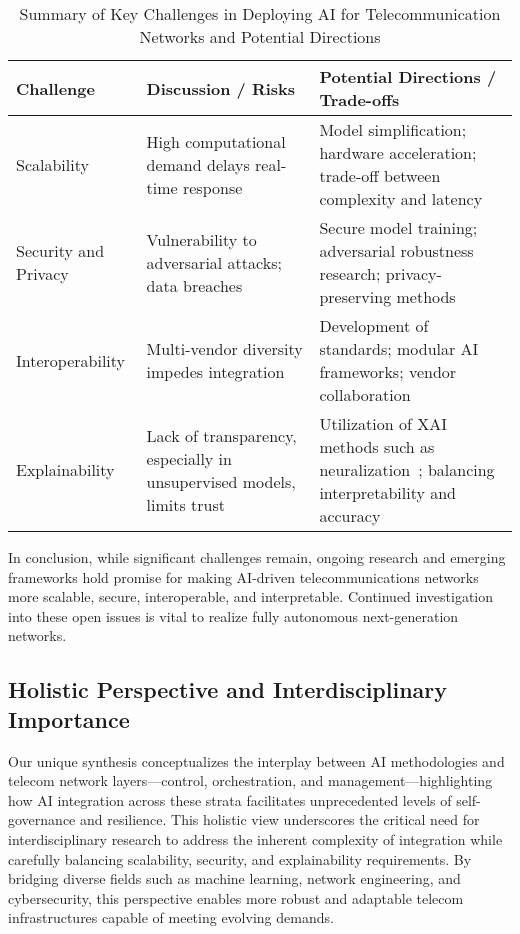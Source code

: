 \documentclass[sigconf]{acmart}
\begin{document}
\begin{table*}[htbp]
\centering
\caption{Summary of Key Challenges in Deploying AI for Telecommunication Networks and Potential Directions}
\label{tab:challenges}
\begin{adjustbox}{max width=\textwidth}
\begin{tabular}{@{}lll@{}}
\toprule
\textbf{Challenge} & \textbf{Discussion / Risks} & \textbf{Potential Directions / Trade-offs} \\ \midrule
Scalability & High computational demand delays real-time response & Model simplification; hardware acceleration; trade-off between complexity and latency \\ 
Security and Privacy & Vulnerability to adversarial attacks; data breaches & Secure model training; adversarial robustness research; privacy-preserving methods \\ 
Interoperability & Multi-vendor diversity impedes integration & Development of standards; modular AI frameworks; vendor collaboration \\ 
Explainability & Lack of transparency, especially in unsupervised models, limits trust & Utilization of XAI methods such as neuralization~\cite{ref45}; balancing interpretability and accuracy \\ \bottomrule
\end{tabular}
\end{adjustbox}
\end{table*}

In conclusion, while significant challenges remain, ongoing research and emerging frameworks hold promise for making AI-driven telecommunications networks more scalable, secure, interoperable, and interpretable. Continued investigation into these open issues is vital to realize fully autonomous next-generation networks.

\subsection{Holistic Perspective and Interdisciplinary Importance}

Our unique synthesis conceptualizes the interplay between AI methodologies and telecom network layers—control, orchestration, and management—highlighting how AI integration across these strata facilitates unprecedented levels of self-governance and resilience. This holistic view underscores the critical need for interdisciplinary research to address the inherent complexity of integration while carefully balancing scalability, security, and explainability requirements. By bridging diverse fields such as machine learning, network engineering, and cybersecurity, this perspective enables more robust and adaptable telecom infrastructures capable of meeting evolving demands.
\end{document}

